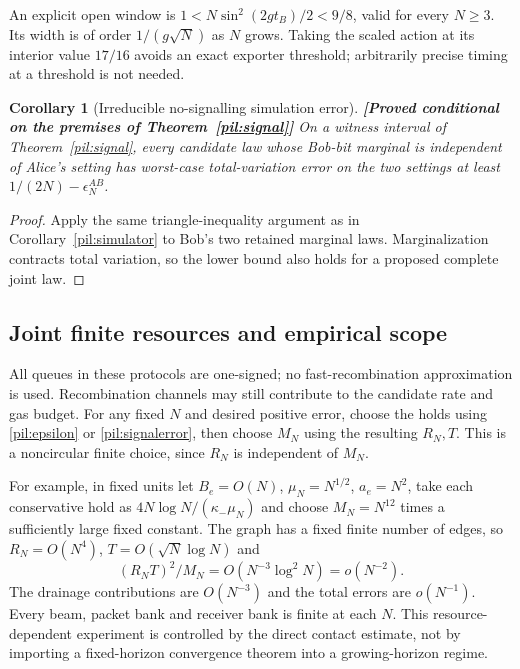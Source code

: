 \documentclass[11pt,a4paper]{article}
\newtheorem{corollary}[theorem]{Corollary}
\theoremstyle{definition}
\theoremstyle{remark}\newtheorem{remark}[theorem]{Remark}
\newcommand{\status}[1]{\textbf{[#1]}\quad}
\begin{document}
An explicit open window is $1<N\sin^2(2gt_B)/2<9/8$, valid for every $N\ge3$. Its width is of order $1/(g\sqrt N)$ as $N$ grows. Taking the scaled action at its interior value $17/16$ avoids an exact exporter threshold; arbitrarily precise timing at a threshold is not needed.

\begin{corollary}[Irreducible no-signalling simulation error]\label{pil:nosignalsimulator}
\status{Proved conditional on the premises of Theorem~\ref{pil:signal}}
On a witness interval of Theorem~\ref{pil:signal}, every candidate law whose Bob-bit marginal is independent of Alice's setting has worst-case total-variation error on the two settings at least $1/(2N)-\epsilon_N^{AB}$.
\end{corollary}
\begin{proof}
Apply the same triangle-inequality argument as in Corollary~\ref{pil:simulator} to Bob's two retained marginal laws. Marginalization contracts total variation, so the lower bound also holds for a proposed complete joint law.
\end{proof}

\subsection{Joint finite resources and empirical scope}

All queues in these protocols are one-signed; no fast-recombination approximation is used. Recombination channels may still contribute to the candidate rate and gas budget. For any fixed $N$ and desired positive error, choose the holds using \eqref{pil:epsilon} or \eqref{pil:signalerror}, then choose $M_N$ using the resulting $R_N,T$. This is a noncircular finite choice, since $R_N$ is independent of $M_N$.

For example, in fixed units let $B_e=O(N)$, $\mu_N=N^{1/2}$, $a_e=N^2$, take each conservative hold as $4N\log N/(\kappa_-\mu_N)$ and choose $M_N=N^{12}$ times a sufficiently large fixed constant. The graph has a fixed finite number of edges, so $R_N=O(N^4)$, $T=O(\sqrt N\log N)$ and
\[
 (R_NT)^2/M_N=O(N^{-3}\log^2N)=o(N^{-2}).
\]
The drainage contributions are $O(N^{-3})$ and the total errors are $o(N^{-1})$. Every beam, packet bank and receiver bank is finite at each $N$. This resource-dependent experiment is controlled by the direct contact estimate, not by importing a fixed-horizon convergence theorem into a growing-horizon regime.
\end{document}
